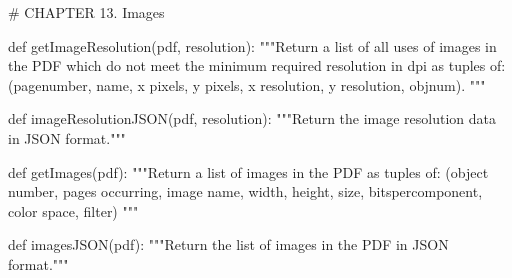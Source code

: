 # CHAPTER 13. Images

def getImageResolution(pdf, resolution):
    """Return a list of all uses of images in the PDF which do not meet the
    minimum required resolution in dpi as tuples of:
    (pagenumber, name, x pixels, y pixels, x resolution, y resolution, objnum).
    """

def imageResolutionJSON(pdf, resolution):
    """Return the image resolution data in JSON format."""

def getImages(pdf):
    """Return a list of images in the PDF as tuples of:
    (object number, pages occurring, image name, width, height, size,
     bitspercomponent, color space, filter)
    """

def imagesJSON(pdf):
    """Return the list of images in the PDF in JSON format."""
